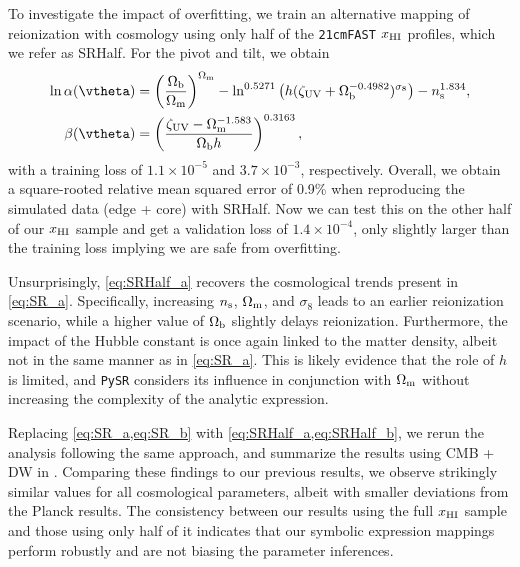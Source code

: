 To investigate the impact of overfitting, we train an alternative
mapping of reionization with cosmology using only half of the
\texttt{21cmFAST} $x_{\mathrm{HI}}$ profiles, which we refer as SRHalf.
For the pivot and tilt, we obtain
%
\begin{align}
\ln\ap(\vtheta) &= \left(\frac{\Omegab}{\Omegam}\right)^{\Omegam} - \ln^{0.5271}{\left(h(\zetaUV + \Omegab^{-0.4982})^{\sigma_8} \right) - \ns^{1.834}}, \label{eq:SRHalf_a} \\
\beta(\vtheta) &= \left( \frac{\zetaUV - \Omegam^{-1.583}}{\Omegab h }\right)^{0.3163}, \label{eq:SRHalf_b}
\end{align}
%
with a training loss of $1.1 \times 10^{-5}$ and $3.7 \times 10^{-3}$, respectively. 
Overall, we obtain a square-rooted relative mean squared error of 0.9\% when 
reproducing the simulated data (edge + core) with SRHalf. 
Now we can test this on the other half of our $x_{\mathrm{HI}}$ sample and get a
validation loss of $1.4 \times 10^{-4}$, only slightly larger than the
training loss implying we are safe from overfitting.

Unsurprisingly, \cref{eq:SRHalf_a} recovers the cosmological trends
present in \cref{eq:SR_a}.
Specifically, increasing $n_\mathrm{s}$, $\Omega_\mathrm{m}$, and $\sigma_8$ leads to an
earlier reionization scenario, while a higher value of $\Omega_\mathrm{b}$
slightly delays reionization.
Furthermore, the impact of the Hubble constant is once again linked to
the matter density, albeit not in the same manner as in
\cref{eq:SR_a}.
This is likely evidence that the role of $h$ is limited, and
\texttt{PySR} considers its influence in conjunction with $\Omega_\mathrm{m}$
without increasing the complexity of the analytic expression.

Replacing \cref{eq:SR_a,eq:SR_b} with \cref{eq:SRHalf_a,eq:SRHalf_b}, we rerun
the analysis following the same approach, and summarize the results using 
CMB + DW in .
Comparing these findings to our previous results, we observe strikingly
similar values for all cosmological parameters, albeit with smaller
deviations from the Planck results.
The consistency between our results using the full $x_{\mathrm{HI}}$ sample and
those using only half of it indicates that our symbolic expression
mappings perform robustly and are not biasing the parameter inferences.


